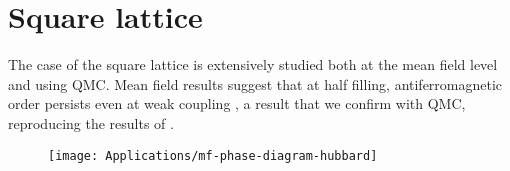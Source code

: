 \section{Square lattice}
\label{sec:square}

The case of the square lattice is extensively studied both at the mean field level and using \acs{QMC}.
Mean field results suggest that at half filling,  antiferromagnetic order persists even at weak coupling \cite{claveau_mean-field_2014, gouveia_magnetic_2015}, a result that we confirm with \acs{QMC}, reproducing the results of \cite{white_numerical_1989, hirsch_two-dimensional_1985}.

\begin{figure}[H]\label{fig:mfHubbardPhaseDiagram}
\hspace{0.68cm}
\texttt{[image: Applications/mf-phase-diagram-hubbard]}
\caption[]{\cite{gouveia_magnetic_2015}}
\end{figure}